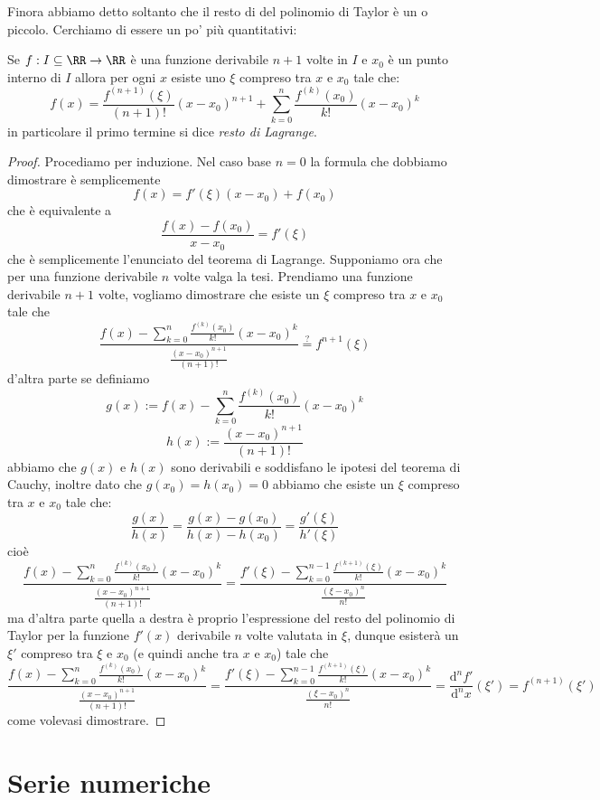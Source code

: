 \documentclass[11pt]{scrartcl}
\newcommand{\dif}{\text{d}}
\begin{document}
	Finora abbiamo detto soltanto che il resto di del polinomio di Taylor è un  o piccolo. Cerchiamo di essere un po' più quantitativi:
	\begin{theorem}
		Se $f:I\subseteq \RR\to\RR$ è una funzione derivabile $n+1$ volte in $I$ e $x_0$ è un punto interno di $I$ allora per ogni $x$ esiste uno $\xi$ compreso tra $x$ e $x_0$ tale che:
		$$f(x)=\frac{f^{(n+1)}(\xi)}{(n+1)!}(x-x_0)^{n+1}+\sum_{k=0}^{n}\frac{f^{\left(k\right)}(x_0)}{k!}(x-x_0)^k$$ 
		in particolare il primo termine si dice \textit{resto di Lagrange}. 
	\end{theorem}
	\begin{proof}
		Procediamo per induzione. Nel caso base $n=0$ la formula che dobbiamo dimostrare è semplicemente
		$$f(x)=f'(\xi)(x-x_0)+f(x_0)$$
		che è equivalente a 
		$$\frac{f(x)-f(x_0)}{x-x_0}=f'(\xi)$$
		che è semplicemente l'enunciato del teorema di Lagrange. Supponiamo ora che per una funzione derivabile $n$ volte valga la tesi. Prendiamo una funzione derivabile $n+1$ volte, vogliamo dimostrare che esiste un $\xi$ compreso tra $x$ e $x_0$ tale che
		$$\frac{f(x)-\sum_{k=0}^{n}\frac{f^{\left(k\right)}(x_0)}{k!}(x-x_0)^k}{\frac{(x-x_0)^{n+1}}{(n+1)!}}\overset{?}{=}f^{n+1}(\xi)$$
		d'altra parte se definiamo
		$$g(x):=f(x)-\sum_{k=0}^{n}\frac{f^{\left(k\right)}(x_0)}{k!}(x-x_0)^k$$
		$$h(x):=\frac{(x-x_0)^{n+1}}{(n+1)!}$$
		abbiamo che $g(x)$ e $h(x)$ sono derivabili e soddisfano le ipotesi del teorema di Cauchy, inoltre dato che $g(x_0)=h(x_0)=0$ abbiamo che esiste un $\xi$ compreso tra $x$ e $x_0$ tale che:
		$$
		\frac{g(x)}{h(x)}=\frac{g(x)-g(x_0)}{h(x)-h(x_0)}=\frac{g'(\xi)}{h'(\xi)}
		$$
		cioè
		$$\frac{f(x)-\sum_{k=0}^{n}\frac{f^{\left(k\right)}(x_0)}{k!}(x-x_0)^k}{\frac{(x-x_0)^{n+1}}{(n+1)!}}=\frac{f'(\xi)-\sum_{k=0}^{n-1}\frac{f^{(k+1)}(\xi)}{k!}(x-x_0)^k}{\frac{(\xi-x_0)^n}{n!}}$$
		ma d'altra parte quella a destra è proprio l'espressione del resto del polinomio di Taylor per la funzione $f'(x)$ derivabile $n$ volte valutata in $\xi$, dunque esisterà un $\xi'$ compreso tra $\xi$ e $x_0$ (e quindi anche tra $x$ e $x_0$) tale che 
		$$
		\frac{f(x)-\sum_{k=0}^{n}\frac{f^{\left(k\right)}(x_0)}{k!}(x-x_0)^k}{\frac{(x-x_0)^{n+1}}{(n+1)!}}=\frac{f'(\xi)-\sum_{k=0}^{n-1}\frac{f^{(k+1)}(\xi)}{k!}(x-x_0)^k}{\frac{(\xi-x_0)^n}{n!}}=\frac{\dif^nf'}{\dif^n x}(\xi')=f^{(n+1)}(\xi')
		$$
		come volevasi dimostrare.
	\end{proof}
	
	
	\newpage
	
	\section{Serie numeriche}
	
\end{document}

